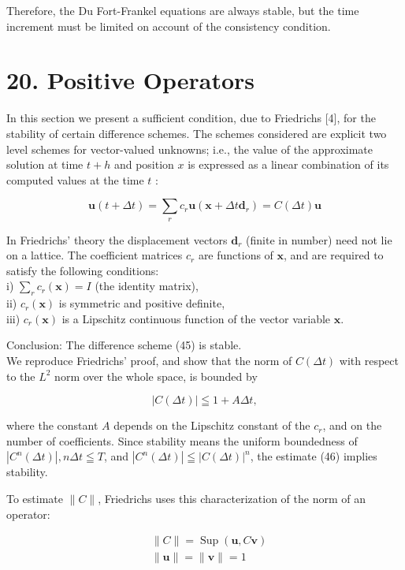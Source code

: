\documentclass[10pt]{article}
\begin{document}
Therefore, the Du Fort-Frankel equations are always stable, but the time increment must be limited on account of the consistency condition.

\section*{20. Positive Operators}
In this section we present a sufficient condition, due to Friedrichs [4], for the stability of certain difference schemes. The schemes considered are explicit two level schemes for vector-valued unknowns; i.e., the value of the approximate solution at time \(t+h\) and position \(x\) is expressed as a linear combination of its computed values at the time \(t\) :

\[
\mathbf{u}(t+\Delta t)=\sum_{r} c_{r} \mathbf{u}\left(\mathbf{x}+\Delta t \mathbf{d}_{r}\right)=C(\Delta t) \mathbf{u}
\]

In Friedrichs' theory the displacement vectors \(\mathbf{d}_{r}\) (finite in number) need not lie on a lattice. The coefficient matrices \(c_{r}\) are functions of \(\mathbf{x}\), and are required to satisfy the following conditions:\\
i) \(\sum_{r} c_{r}(\mathbf{x})=I\) (the identity matrix),\\
ii) \(c_{r}(\mathbf{x})\) is symmetric and positive definite,\\
iii) \(c_{r}(\mathbf{x})\) is a Lipschitz continuous function of the vector variable \(\mathbf{x}\).

Conclusion: The difference scheme (45) is stable.\\
We reproduce Friedrichs' proof, and show that the norm of \(C(\Delta t)\) with respect to the \(L^{2}\) norm over the whole space, is bounded by

\[
|C(\Delta t)| \leqq 1+A \Delta t,
\]

where the constant \(A\) depends on the Lipschitz constant of the \(c_{r}\), and on the number of coefficients. Since stability means the uniform boundedness of \(\left|C^{n}(\Delta t)\right|, n \Delta t \leqq T\), and \(\left|C^{n}(\Delta t)\right| \leqq|C(\Delta t)|^{n}\), the estimate (46) implies stability.

To estimate \(\|C\|\), Friedrichs uses this characterization of the norm of an operator:

\[
\begin{aligned}
& \|C\|=\operatorname{Sup}(\mathbf{u}, C \mathbf{v}) \\
& \|\mathbf{u}\|=\|\mathbf{v}\|=1
\end{aligned}
\]
\end{document}
